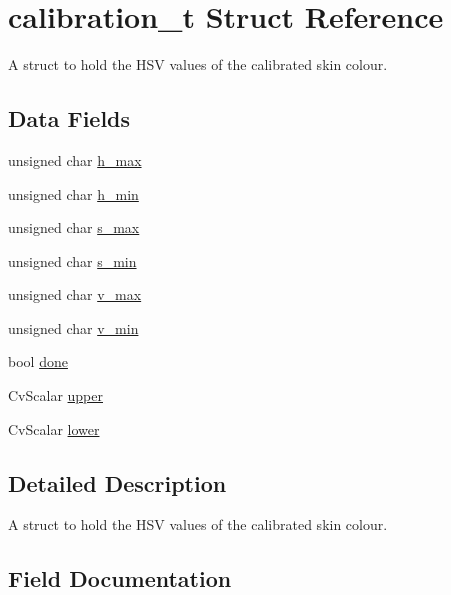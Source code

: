 \hypertarget{structcalibration__t}{}\section{calibration\+\_\+t Struct Reference}
\label{structcalibration__t}


A struct to hold the H\+SV values of the calibrated skin colour.  


\subsection*{Data Fields}
\begin{DoxyCompactItemize}
\item 
unsigned char \hyperlink{structcalibration__t_acd97fa79e525e64737d8702d397cb5f3}{h\+\_\+max}
\item 
unsigned char \hyperlink{structcalibration__t_a3e7b54f5a944fac9d22227d36df4f4b7}{h\+\_\+min}
\item 
unsigned char \hyperlink{structcalibration__t_af47b23a52b19fe1b9c097f16cf39c38e}{s\+\_\+max}
\item 
unsigned char \hyperlink{structcalibration__t_a408c4087fc2037c302179889a77c46da}{s\+\_\+min}
\item 
unsigned char \hyperlink{structcalibration__t_accaf5519bae1849954995bcdf673f1cd}{v\+\_\+max}
\item 
unsigned char \hyperlink{structcalibration__t_a05d985e74be2e4415fe9239137672741}{v\+\_\+min}
\item 
bool \hyperlink{structcalibration__t_af77af4f1701757e606eaf3e368b4e3ac}{done}
\item 
Cv\+Scalar \hyperlink{structcalibration__t_ab577a4447f9cfff14e7cb336c18fcc96}{upper}
\item 
Cv\+Scalar \hyperlink{structcalibration__t_af589528a1493701150229b3d41e13bfa}{lower}
\end{DoxyCompactItemize}


\subsection{Detailed Description}
A struct to hold the H\+SV values of the calibrated skin colour. 

\subsection{Field Documentation}
